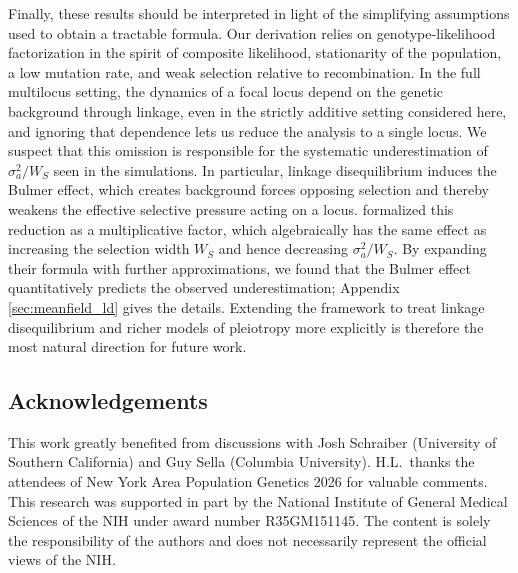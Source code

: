 \documentclass[10pt]{article}
\begin{document}
Finally, these results should be interpreted in light of the simplifying assumptions used to obtain a tractable formula. Our derivation relies on genotype-likelihood factorization in the spirit of composite likelihood, stationarity of the population, a low mutation rate, and weak selection relative to recombination. In the full multilocus setting, the dynamics of a focal locus depend on the genetic background through linkage, even in the strictly additive setting considered here, and ignoring that dependence lets us reduce the analysis to a single locus. We suspect that this omission is responsible for the systematic underestimation of $\sigma_a^2/W_S$ seen in the simulations. In particular, linkage disequilibrium induces the Bulmer effect, which creates background forces opposing selection and thereby weakens the effective selective pressure acting on a locus. \citet{Negm_2026} formalized this reduction as a multiplicative factor, which algebraically has the same effect as increasing the selection width $W_S$ and hence decreasing $\sigma_a^2/W_S$. By expanding their formula with further approximations, we found that the Bulmer effect quantitatively predicts the observed underestimation; Appendix \ref{sec:meanfield_ld} gives the details. Extending the framework to treat linkage disequilibrium and richer models of pleiotropy more explicitly is therefore the most natural direction for future work.


\subsection*{Acknowledgements}
This work greatly benefited from discussions with Josh Schraiber (University of Southern California) and Guy Sella (Columbia University). 
H.L.~thanks the attendees of New York Area Population Genetics 2026 for valuable comments.
This research was supported in part by the National Institute of General Medical Sciences of the
NIH under award number R35GM151145. The content is solely the responsibility of the authors
and does not necessarily represent the official views of the NIH.


\printbibliography

\newpage

\appendix
\setcounter{figure}{0}
\setcounter{equation}{0}

\renewcommand{\thefigure}{A\arabic{figure}}
\renewcommand{\thetable}{A\arabic{table}}
\renewcommand{\theequation}{A\arabic{equation}}
\renewcommand{\theHfigure}{A\arabic{figure}}
\renewcommand{\theHtable}{A\arabic{table}}
\renewcommand{\theHequation}{A\arabic{equation}}
\end{document}
